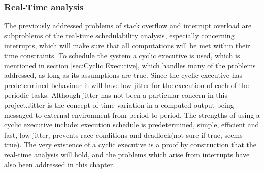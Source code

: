 \subsubsection{Real-Time analysis}
\label{sec:Real-Time analysis}
The previously addressed problems of stack overflow and interrupt overload are subproblems of the real-time schedulability analysis, especially concerning interrupts, which will make sure that all computations will be met within their time constraints. \newline
To schedule the system a cyclic executive is used, which is mentioned in section \ref{sec:Cyclic Executive}, which handles many of the problems addressed, as long as its assumptions are true. 
Since the cyclic executive has predetermined behaviour it will have low jitter for the execution of each of the periodic tasks. Although jitter has not been a particular concern in this project.\newline Jitter is the concept of time variation in a computed output being messaged to external environment from period to period. \newline
The strengths of using a cyclic executive include: execution schedule is predetermined, simple, efficient and fast, low jitter, prevents race-conditions and deadlock(not sure if true, seems true). 
The very existence of a cyclic executive is a proof by construction that the real-time analysis will hold, and the problems which arise from interrupts have also been addressed in this chapter.